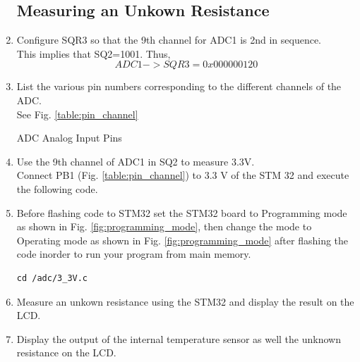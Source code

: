 \documentclass[journal,12pt,twocolumn]{IEEEtran}
\renewcommand\thesection{\arabic{section}}
\renewcommand\thesubsection{\thesection.\arabic{subsection}}
\begin{document}
\begin{enumerate}[label=\thesubsection.\arabic*.,ref=\thesubsection.\theenumi]
\subsection{Measuring an Unkown Resistance}
\item Configure SQR3 so that the 9th channel for ADC1 is 2nd in sequence.
\\
\solution This implies that SQ2=1001.  Thus,
\begin{equation}
ADC1->SQR3 = 0x000000120
\end{equation}
\item List the various pin numbers corresponding to the different channels of the ADC.
\\
\solution See Fig. \ref{table:pin_channel}
\begin{table}[!ht]
\footnotesize

\caption{ADC Analog Input Pins}
\label{table:pin_channel}
\end{table}
\item Use the 9th channel of  ADC1 in SQ2 to measure 3.3V. 
\\
\solution Connect PB1 (Fig. \ref{table:pin_channel}) to 3.3 V of the STM 32 and execute the following
code.
\item Before flashing code to STM32 set the STM32 board to Programming mode as shown in Fig. \ref{fig:programming_mode}, then change the mode to Operating mode as shown in Fig. \ref{fig:programming_mode} after flashing the code inorder to run your program from main memory.
\begin{lstlisting}
cd /adc/3_3V.c
\end{lstlisting}
\item Measure an unkown resistance using the STM32 and display the result on the LCD.
\item Display the output of the internal temperature sensor as well the unknown resistance on the LCD.
\end{enumerate}
\end{document}
